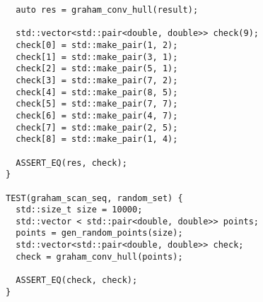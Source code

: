 \documentclass{report}
\begin{document}
\begin{lstlisting}
  auto res = graham_conv_hull(result);

  std::vector<std::pair<double, double>> check(9);
  check[0] = std::make_pair(1, 2);
  check[1] = std::make_pair(3, 1);
  check[2] = std::make_pair(5, 1);
  check[3] = std::make_pair(7, 2);
  check[4] = std::make_pair(8, 5);
  check[5] = std::make_pair(7, 7);
  check[6] = std::make_pair(4, 7);
  check[7] = std::make_pair(2, 5);
  check[8] = std::make_pair(1, 4);

  ASSERT_EQ(res, check);
}

TEST(graham_scan_seq, random_set) {
  std::size_t size = 10000;
  std::vector < std::pair<double, double>> points;
  points = gen_random_points(size);
  std::vector<std::pair<double, double>> check;
  check = graham_conv_hull(points);

  ASSERT_EQ(check, check);
}

\end{lstlisting}
\end{document}
